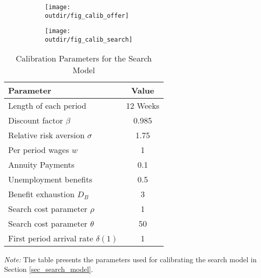 \documentclass{div}
\newcommand{\outdir}{./../output}
\begin{document}
\begin{figure}[t]\caption{Calibration of the Search Model}\label{fig_calibration}
\centering
\begin{subfigure}{.475\textwidth}
\texttt{[image: \\outdir/fig\_calib\_offer]}
\end{subfigure} 
\begin{subfigure}{.475\textwidth}
\texttt{[image: \\outdir/fig\_calib\_search]}
\end{subfigure}
\end{figure}



\clearpage
\setcounter{table}{0}
\setcounter{figure}{0}
\renewcommand{\thetable}{B\arabic{table}}
\renewcommand{\thefigure}{B\arabic{figure}}

\begin{table}[h]
\begin{threeparttable}
\caption{Calibration Parameters for the Search Model}\label{tab_calib_details}
\begin{tabularx}{\textwidth}{p{}c}
\toprule
Parameter & Value \\
\midrule
Length of each period & 12 Weeks \\
Discount factor $\beta$ & 0.985 \\
Relative risk aversion $\sigma$ & 1.75 \\
Per period wages $w$ & 1 \\
Annuity Payments & 0.1 \\
Unemployment benefits & 0.5 \\
Benefit exhaustion $D_B$ & 3 \\
Search cost parameter $\rho$ & 1 \\
Search cost parameter $\theta$ & 50 \\
First period arrival rate $\delta(1)$ & 1 \\
\bottomrule
\end{tabularx}
\begin{tablenotes}
\item \textit{Note:} The table presents the parameters used for calibrating the search model in Section \ref{sec_search_model}.
\end{tablenotes}
\end{threeparttable}
\end{table}
\end{document}
